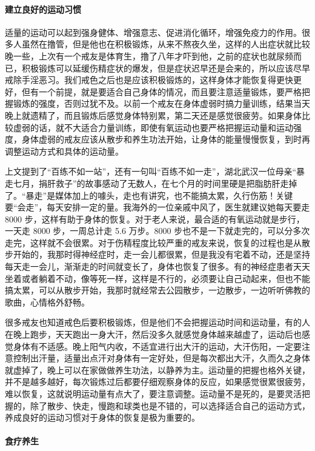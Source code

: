 \paragraph{建立良好的运动习惯}

适量的运动可以起到强身健体、增强意志、促进消化循环，增强免疫力的作用。很多人虽然在撸管，但是他也在积极锻炼，从来不熬夜久坐，这样的人出症状就比较晚一些，上次有一个戒友是体育生，撸了八年才吓到他，之前的症状也就尿频而已，积极锻炼可以延缓伤精症状的爆发，但是症状迟早还是会来的，所以应该尽早戒除手淫恶习。我们戒色之后也是应该积极锻炼的，这样身体才能恢复得更快更好，但有一个前提，就是要适合自己身体的情况，而且要注意适量锻炼，要严格把握锻炼的强度，否则过犹不及。以前一个戒友在身体虚弱时搞力量训练，结果当天晚上就遗精了，而且锻炼后感觉身体特别累，第二天还是感觉很疲劳。如果身体比较虚弱的话，就不大适合力量训练，即使有氧运动也要严格把握运动量和运动强度，身体虚弱的戒友应该从散步和养生功法开始，让身体的能量慢慢恢复，到时再调整运动方式和具体的运动量。

上文提到了“百练不如一站”，还有一句叫“百练不如一走”，湖北武汉一位母亲“暴走七月，捐肝救子”的故事感动了无数人，在七个月的时间里硬是把脂肪肝走掉了。“暴走”是媒体加上的噱头，走也有讲究，也不能搞太累，久行伤筋！关键要“会走”，每天安排一定的量。我海外的一位亲戚中风了，医生就建议她每天要走 8000 步，这样有助于身体的恢复。对于老人来说，最合适的有氧运动就是步行，一天走 8000 步，一周总计走 5.6 万步。8000 步也不是一下就走完的，可以分多次走完，这样就不会很累。对于伤精程度比较严重的戒友来说，恢复的过程也是从散步开始的，我那时得神经症时，走一会儿都很累，但是我没有宅着不动，还是坚持每天走一会儿，渐渐走的时间就变长了，身体也恢复了很多。有的神经症患者天天坐着或者躺着不动，像等死一样，这样是不行的，必须要让自己动起来，但也不能搞太累，可以从散步开始，我那时就经常去公园散步，一边散步，一边听听佛教的歌曲，心情格外舒畅。

很多戒友也知道戒色后要积极锻炼，但是他们不会把握运动时间和运动量，有的人在晚上跑步，天天跑出一身大汗，然后没多久就感觉身体越来越虚了，运动后也感觉身体有不适感。晚上阳气内收，不适宜进行出大汗的运动，大汗伤阳，一定要注意控制出汗量，适量出点汗对身体有一定好处，但是每次都出大汗，久而久之身体就虚掉了，晚上可以在家做做养生功法，以静养为主。运动量的把握也格外关键，并不是越多越好，每次锻炼过后都要仔细观察身体的反应，如果感觉很累很疲劳，难以恢复，这就说明运动量有点大了，要注意调整。运动量不是死的，是要灵活把握的，除了散步、快走，慢跑和球类也是不错的，可以选择适合自己的运动方式，养成良好的运动习惯对于身体的恢复是极为重要的。

\paragraph{食疗养生}

